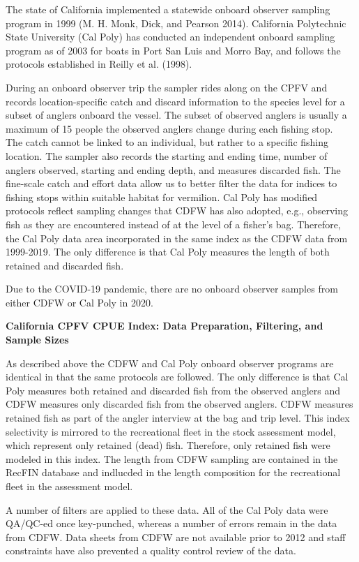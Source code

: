 \documentclass[
  english,
  a4paper,
]{article}
\begin{document}
The state of California implemented a statewide onboard observer sampling
program in 1999 (M. H. Monk, Dick, and Pearson 2014). California Polytechnic State University (Cal
Poly) has conducted an independent onboard sampling
program as of 2003 for boats in Port San Luis and Morro Bay, and follows
the protocols established in Reilly et al. (1998).

During an onboard observer trip the sampler rides along on the CPFV and records
location-specific catch and discard information to the species level for a subset
of anglers onboard the vessel. The subset of observed anglers is usually a
maximum of 15 people the observed anglers change during each fishing stop.\\
The catch cannot be linked to an individual, but rather
to a specific fishing location. The sampler also records the starting and
ending time, number of anglers observed, starting and ending depth, and measures
discarded fish. The fine-scale catch and effort data allow us to better filter
the data for indices to fishing stops within suitable habitat for vermilion.
Cal Poly has modified protocols reflect sampling changes that CDFW
has also adopted, e.g., observing fish as they are encountered instead of at
the level of a fisher's bag. Therefore, the Cal Poly data area incorporated in
the same index as the CDFW data from 1999-2019. The only difference is that
Cal Poly measures the length of both retained and discarded fish.

Due to the COVID-19 pandemic, there are no onboard observer samples from either
CDFW or Cal Poly in 2020.

\textbf{California CPFV CPUE Index: Data Preparation, Filtering, and Sample Sizes}

As described above the CDFW and Cal Poly onboard observer programs are identical
in that the same protocols are followed. The only difference is that Cal Poly
measures both retained and discarded fish from the observed anglers and CDFW
measures only discarded fish from the observed anglers. CDFW measures retained
fish as part of the angler interview at the bag and trip level. This index
selectivity is mirrored to the recreational
fleet in the stock assessment model, which represent only retained (dead)
fish. Therefore, only retained fish were modeled in this index. The length
from CDFW sampling are contained in the RecFIN database and indlucded in the
length composition for the recreational fleet in the assessment model.

A number of filters are applied to these data. All of the Cal Poly data were
QA/QC-ed once key-punched, whereas a number of errors remain in the
data from CDFW. Data sheets from CDFW are not available prior to 2012 and
staff constraints have also prevented a quality control review of the data.
\end{document}
